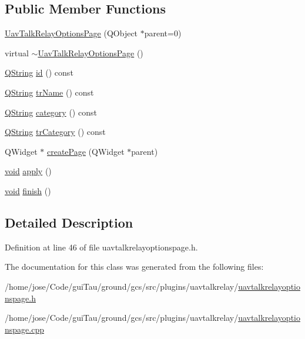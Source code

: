 \subsection*{Public Member Functions}
\begin{DoxyCompactItemize}
\item 
\hyperlink{group___u_a_v_talk_gac97773c8e2650a9c89d3b44262b3c9a5}{Uav\-Talk\-Relay\-Options\-Page} (Q\-Object $\ast$parent=0)
\item 
virtual \hyperlink{group___u_a_v_talk_gab4a5b0b63eba0e6df8f5d81ab10f5fff}{$\sim$\-Uav\-Talk\-Relay\-Options\-Page} ()
\item 
\hyperlink{group___u_a_v_objects_plugin_gab9d252f49c333c94a72f97ce3105a32d}{Q\-String} \hyperlink{group___u_a_v_talk_ga1a7f2a6d7fe0eab1466ad5fef1d77448}{id} () const 
\item 
\hyperlink{group___u_a_v_objects_plugin_gab9d252f49c333c94a72f97ce3105a32d}{Q\-String} \hyperlink{group___u_a_v_talk_gaa9de5e7b246a6ed8f405cd79586bcbab}{tr\-Name} () const 
\item 
\hyperlink{group___u_a_v_objects_plugin_gab9d252f49c333c94a72f97ce3105a32d}{Q\-String} \hyperlink{group___u_a_v_talk_ga096c5d44abc589317aae875f985190ed}{category} () const 
\item 
\hyperlink{group___u_a_v_objects_plugin_gab9d252f49c333c94a72f97ce3105a32d}{Q\-String} \hyperlink{group___u_a_v_talk_ga06b96ea896336a6b5cbf6431a19b60f7}{tr\-Category} () const 
\item 
Q\-Widget $\ast$ \hyperlink{group___u_a_v_talk_ga07ae0ea88536d2fd82f9f9ddb84cb3cc}{create\-Page} (Q\-Widget $\ast$parent)
\item 
\hyperlink{group___u_a_v_objects_plugin_ga444cf2ff3f0ecbe028adce838d373f5c}{void} \hyperlink{group___u_a_v_talk_gac14cce3fcdf4dc493bfc8777032d1b41}{apply} ()
\item 
\hyperlink{group___u_a_v_objects_plugin_ga444cf2ff3f0ecbe028adce838d373f5c}{void} \hyperlink{group___u_a_v_talk_ga3c6b3400f3c46755bcc572ba5b76e9af}{finish} ()
\end{DoxyCompactItemize}


\subsection{Detailed Description}


Definition at line 46 of file uavtalkrelayoptionspage.\-h.



The documentation for this class was generated from the following files\-:\begin{DoxyCompactItemize}
\item 
/home/jose/\-Code/gui\-Tau/ground/gcs/src/plugins/uavtalkrelay/\hyperlink{uavtalkrelayoptionspage_8h}{uavtalkrelayoptionspage.\-h}\item 
/home/jose/\-Code/gui\-Tau/ground/gcs/src/plugins/uavtalkrelay/\hyperlink{uavtalkrelayoptionspage_8cpp}{uavtalkrelayoptionspage.\-cpp}\end{DoxyCompactItemize}
